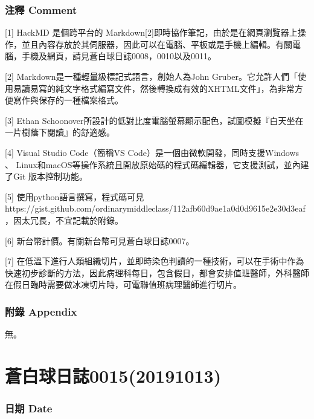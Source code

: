\documentclass[a5paper, 12pt
]{book}
\begin{document}
\hypertarget{ux6ce8ux91cb-comment-7}{%
\subsubsection{注釋 Comment}\label{ux6ce8ux91cb-comment-7}}

{[}1{]} HackMD 是個跨平台的
Markdown{[}2{]}即時協作筆記，由於是在網頁瀏覽器上操作，並且內容存放於其伺服器，因此可以在電腦、平板或是手機上編輯。有關電腦，手機及網頁，請見蒼白球日誌0008，0010以及0011。

{[}2{]} Markdown是一種輕量級標記式語言，創始人為John
Gruber。它允許人們「使用易讀易寫的純文字格式編寫文件，然後轉換成有效的XHTML文件」，為非常方便寫作與保存的一種檔案格式。

{[}3{]} Ethan
Schoonover所設計的低對比度電腦螢幕顯示配色，試圖模擬『白天坐在一片樹蔭下閱讀』的舒適感。

{[}4{]} Visual Studio Code（簡稱VS
Code）是一個由微軟開發，同時支援Windows 、
Linux和macOS等操作系統且開放原始碼的程式碼編輯器，它支援測試，並內建了Git
版本控制功能。

{[}5{]} 使用python語言撰寫，程式碼可見
https://gist.github.com/ordinarymiddleclass/112afb60d9ae1a0d0d9615e2e30d3eaf
，因太冗長，不宜記載於附錄。

{[}6{]} 新台幣計價。有關新台幣可見蒼白球日誌0007。

{[}7{]}
在低溫下進行人類組織切片，並即時染色判讀的一種技術，可以在手術中作為快速初步診斷的方法，因此病理科每日，包含假日，都會安排值班醫師，外科醫師在假日臨時需要做冰凍切片時，可電聯值班病理醫師進行切片。

\hypertarget{ux9644ux9304-appendix-6}{%
\subsubsection{附錄 Appendix}\label{ux9644ux9304-appendix-6}}

無。

\hypertarget{ux84bcux767dux7403ux65e5ux8a8c001520191013}{%
\section{蒼白球日誌0015(20191013)}\label{ux84bcux767dux7403ux65e5ux8a8c001520191013}}

\hypertarget{ux65e5ux671f-date-14}{%
\subsubsection{日期 Date}\label{ux65e5ux671f-date-14}}
\end{document}
